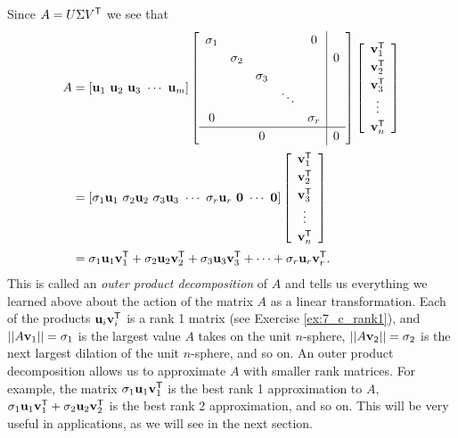 Since $A = U \Sigma V^{\mathsf{T}}$ we see that
\begin{align}
A &= [ \vu_1 \ \vu_2 \ \vu_3 \ \cdots \ \vu_m] \left[ \begin{array}{ccccc|c} \sigma_1&&&&0& \\ & \sigma_2&&&&0 \\ && \sigma_3&&& \\ &  & & \ddots & & \\ 0&&&& \sigma_r \\ \hline &&0&&&0 \end{array} \right] \left[ \renewcommand{\arraystretch}{1.2} \begin{array}{c} \vv_1^{\tr} \\ \vv_2^{\tr} \\ \vv_3^{\tr} \\ \vdots \\ \vv_n^{\tr} \end{array} \right] \notag \\
	&= [ \sigma_1\vu_1 \ \sigma_2\vu_2 \ \sigma_3\vu_3 \ \cdots \ \sigma_r\vu_r \ \vzero \ \cdots \ \vzero] \left[ \renewcommand{\arraystretch}{1.2} \begin{array}{c} \vv_1^{\tr} \\ \vv_2^{\tr} \\ \vv_3^{\tr} \\ \vdots \\ \vv_n^{\tr} \end{array} \right] \notag \\
	&= \sigma_1 \vu_1\vv_1^{\tr} + \sigma_2 \vu_2\vv_2^{\tr} + \sigma_3 \vu_3\vv_3^{\tr} + \cdots + \sigma_r \vu_r\vv_r^{\tr}. \label{eq:7_c_SVD}
\end{align}
This is called an \emph{outer product decomposition} of $A$ and tells us everything we learned above about the action of the matrix $A$ as a linear transformation. Each of the products $\mathbf{u}_i\mathbf{v}_i^{\mathsf{T}}$ is a rank 1 matrix (see Exercise \ref{ex:7_c_rank1}), and $||A\mathbf{v}_1|| = \sigma_1$ is the largest value $A$ takes on the unit $n$-sphere, $||A\mathbf{v}_2|| = \sigma_2$ is the next largest dilation of the unit $n$-sphere, and so on. An outer product decomposition allows us to approximate $A$ with smaller rank matrices. For example, the matrix $\sigma_1 \mathbf{u}_1\mathbf{v}_1^{\mathsf{T}}$ is the best rank 1 approximation to $A$, $\sigma_1 \mathbf{u}_1\mathbf{v}_1^{\mathsf{T}} + \sigma_2 \mathbf{u}_2\mathbf{v}_2^{\mathsf{T}} $ is the best rank 2 approximation, and so on. This will be very useful in applications, as we will see in the next section. 

